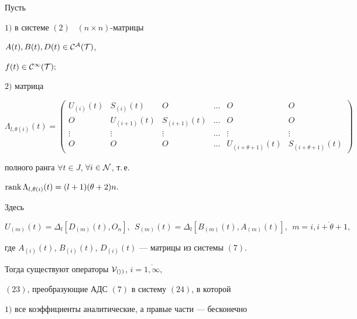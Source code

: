 \begin{thm}


Пусть





\noindent{}$1)$ в системе $(2)$ \ $(n \times n)$-матрицы


$A(t),B(t),D(t) \in \cal C^A(T)$,


$f(t) \in \cal C^{\infty} (T);$





\noindent{}$2)$ матрица


$$


\Lambda_{l,\theta (i)}(t)=


\begin{pmatrix}


U_{(i)}(t) & S_{(i)}(t) & O & \dotsc & O & O \\


O & U_{(i+1)}(t) & S_{(i+1)}(t) & \dotsc & O & O \\


\vdots & \vdots & \vdots & \dotsc & \vdots & \vdots\\


O & O & O & \dotsc & U_{(i+\theta +1)}(t) & S_{(i+\theta +1)}(t)


\end{pmatrix}


$$


полного ранга $\forall t \in J$, \; $\forall i \in \cal N $, т.\,е.


$\operatorname{rank} \Lambda_{l,\theta (i)}(t) =(l+1)(\theta+2)n.$


Здесь


$$


U_{(m)}(t)=\Delta_l[D_{(m)}(t), O_n], \ \ 


S_{(m)}(t)=\Delta_l[B_{(m)}(t),A_{(m)}(t)], \ \


m=\overline{i,i+\theta +1},


$$


где $A_{(i)}(t)$, $B_{(i)}(t)$, $D_{(i)}(t)$ --- матрицы из системы $(7)$.





Тогда существуют операторы $\cal V_{(i)}$, $i=\overline{1,\infty}$,


$(23)$, преобразующие АДС $(7)$ в систему $(24)$, в которой





\noindent{}$1)$ все коэффициенты аналитические, а правые части --- бесконечно



\end{thm}
